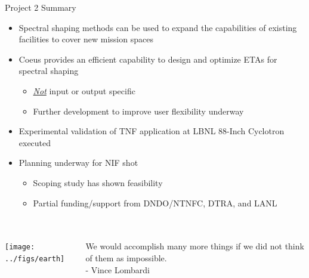 \documentclass[xcolor=x11names,compress]{beamer}
\renewcommand{\(}{\begin{columns}}
\renewcommand{\)}{\end{columns}}
\newcommand{\<}[1]{\begin{column}{#1}}
\renewcommand{\>}{\end{column}}
\begin{document}
\begin{frame}{Project 2 Summary}
  \begin{itemize}
    \item Spectral shaping methods can be used to expand the capabilities of existing facilities to cover new mission spaces \newline
    \item Coeus provides an efficient capability to design and optimize ETAs for spectral shaping 
    \begin{itemize}
      \item \textit{\underline{Not}} input or output specific
      \item Further development to improve user flexibility underway \newline
    \end{itemize}
    \item Experimental validation of TNF application at LBNL 88-Inch Cyclotron executed \newline
    \item Planning underway for NIF shot
    \begin{itemize}
      \item Scoping study has shown feasibility
      \item Partial funding/support from DNDO/NTNFC, DTRA, and LANL \newline
    \end{itemize}
      
  \end{itemize}
\end{frame}

\section*{}
\begin{frame}[fragile]
        \begin{columns}
        \begin{column}{0.55\linewidth}
          \texttt{[image: ../figs/earth]}
        \end{column}
        
        \begin{column}{0.45\linewidth}
We would accomplish many more things if we did not think of them as impossible. \\
\vspace*{1em}
- Vince Lombardi
        \end{column}
      \end{columns}
  \begin{center}
  \end{center}
  
\end{frame}
\end{document}
